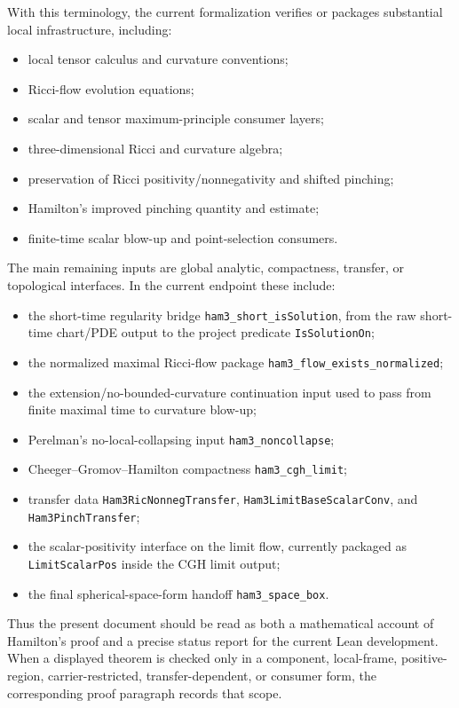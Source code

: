 \documentclass[11pt]{article}
\theoremstyle{plain}
\theoremstyle{definition}
\theoremstyle{remark}
\newcommand{\leanref}[1]{\nolinkurl{#1}}
\begin{document}
With this terminology, the current formalization verifies or packages
substantial local infrastructure, including:
\begin{itemize}[leftmargin=2em]
  \item local tensor calculus and curvature conventions;
  \item Ricci-flow evolution equations;
  \item scalar and tensor maximum-principle consumer layers;
  \item three-dimensional Ricci and curvature algebra;
  \item preservation of Ricci positivity/nonnegativity and shifted pinching;
  \item Hamilton's improved pinching quantity and estimate;
  \item finite-time scalar blow-up and point-selection consumers.
\end{itemize}
The main remaining inputs are global analytic, compactness, transfer, or
topological interfaces.  In the current endpoint these include:
\begin{itemize}[leftmargin=2em]
  \item the short-time regularity bridge
    \leanref{ham3_short_isSolution}, from the raw short-time chart/PDE output to
    the project predicate \leanref{IsSolutionOn};
  \item the normalized maximal Ricci-flow package
    \leanref{ham3_flow_exists_normalized};
  \item the extension/no-bounded-curvature continuation input used to pass from
    finite maximal time to curvature blow-up;
  \item Perelman's no-local-collapsing input \leanref{ham3_noncollapse};
  \item Cheeger--Gromov--Hamilton compactness \leanref{ham3_cgh_limit};
  \item transfer data
    \leanref{Ham3RicNonnegTransfer},
    \leanref{Ham3LimitBaseScalarConv}, and
    \leanref{Ham3PinchTransfer};
  \item the scalar-positivity interface on the limit flow, currently packaged
    as \leanref{LimitScalarPos} inside the CGH limit output;
  \item the final spherical-space-form handoff
    \leanref{ham3_space_box}.
\end{itemize}
Thus the present document should be read as both a mathematical account of
Hamilton's proof and a precise status report for the current Lean development.
When a displayed theorem is checked only in a component, local-frame,
positive-region, carrier-restricted, transfer-dependent, or consumer form, the
corresponding proof paragraph records that scope.
\end{document}
